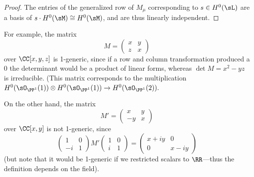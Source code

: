 \begin{proof} The entries of the generalized row of $M_\mu$ corresponding to $s\in H^0(\sL)$
are a basis of $s\cdot H^0(\sM) \cong H^0(\sM)$, and are thus
linearly independent.
\end{proof}

\begin{example}
For example, the matrix 
$$
M = \begin{pmatrix}
 x &y\\
 z&x
\end{pmatrix}
$$
over $\CC[x,y,z]$ is  1-generic, since if a row and column transformation produced a 0 the determinant would be a product of linear forms, whereas
$\det M = x^2-yz$ is irreducible. (This matrix corresponds to the multiplication 
$H^{0}(\sO_{\PP^{1}}(1)) \otimes
H^{0}(\sO_{\PP^{1}}(1)) 
\to H^{0}(\sO_{\PP^{1}}(2)).
$

On the other hand, the matrix
$$
M' = \begin{pmatrix}
 x &y\\
 -y&x
\end{pmatrix}
$$
over $\CC[x,y]$ is not 1-generic, since
$$
\begin{pmatrix}
1&0\\
-i&1 
\end{pmatrix}
M'
\begin{pmatrix}
 1&0\\
 i&1
\end{pmatrix}
= 
\begin{pmatrix}
 x+iy&0\\
 0&x-iy
\end{pmatrix}
$$
(but note that it would be 1-generic if we restricted scalars to $\RR$---thus the definition depends on the field).
\end{example}

